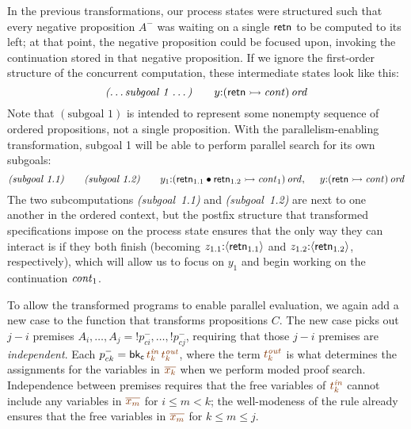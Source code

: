 In the previous transformations, our process states were structured
such that every negative proposition $A^-$ was waiting on a single
${\sf retn}$ to be computed to its left; at that point, the negative
proposition could be focused upon, invoking the
continuation stored in that negative proposition. If we ignore the
first-order structure of the concurrent computation, these
intermediate states look like this:
\[ 
  \mbox{\it (\ldots subgoal 1 \ldots)}
  ~~~~~~
  y{:}{({\sf retn} \rightarrowtail {\it cont})}\,{{\it ord}}
\]
Note that $(\mbox{subgoal 1})$ is intended to represent some nonempty
sequence of ordered propositions, not a single proposition. With the
parallelism-enabling transformation, subgoal 1 will be able to perform
parallel search for its own subgoals:
\[ 
 \mbox{\it (subgoal 1.1)}
 ~~~~~~
 \mbox{\it (subgoal 1.2)} 
 ~~~~~~
   y_1{:}{({\sf retn}_{1.1} \mathbin{\bullet} {\sf retn}_{1.2} \rightarrowtail {\it cont}_1)}\,{{\it ord}}, 
 ~~~~
   y{:}{({\sf retn} \rightarrowtail {\it cont})}\,{{\it ord}}
\]
The two subcomputations \mbox{\it (subgoal 1.1)} and \mbox{\it (subgoal
  1.2)} are next to one another in the ordered context, but the
postfix 
structure that transformed specifications impose on the
process state ensures that the only way they
can interact is if they both finish (becoming $z_{1.1}{:}\langle {{\sf
    retn}_{1.1}} \rangle$ and $z_{1.2}{:}\langle {{\sf retn}_{1.2}} \rangle$, 
respectively), which will
allow us to focus on $y_1$ and begin working on the continuation ${\it
  cont}_1$. 

To allow the transformed programs to enable parallel evaluation, we again add a
new case to the function that transforms propositions $C$.  The new
case picks out $j - i$ premises $A_i, \ldots, A_j =
{!}p^-_{ci},\ldots,{!}p^-_{cj}$, requiring that those $j - i$ premises
are {\it independent}. Each $p^-_{ck} = {\sf bk_c}\,\lf{t^{\it
    in}_k}\,\lf{t^{\it out}_k}$, where the term $\lf{t^{\it out}_k}$
is what determines the assignments for the variables in
$\lf{\overline{x_k}}$ when we perform moded proof search. Independence
between premises requires that the free variables of $\lf{t^{\it
    in}_k}$ cannot include any variables in $\lf{\overline{x_m}}$ for
$i \leq m < k$; the well-modeness of the rule already ensures that the
free variables in $\lf{\overline{x_m}}$ for $k \leq m \leq j$.

